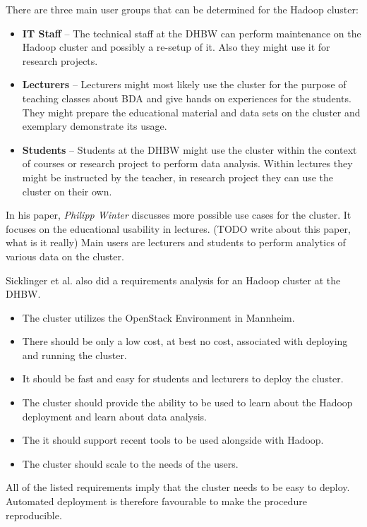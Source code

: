 There are three main user groups that can be determined for the Hadoop cluster:

\begin{itemize}
    \item \textbf{IT Staff} -- The technical staff at the \ac{DHBW} can perform maintenance on the Hadoop cluster and possibly a re-setup of it.
    Also they might use it for research projects.
    \item \textbf{Lecturers} -- Lecturers might most likely use the cluster for the purpose of teaching classes about \ac{BDA} and give hands on experiences for the students. They might prepare the educational material and data sets on the cluster and exemplary demonstrate its usage.
    \item \textbf{Students} -- Students at the \ac{DHBW} might use the cluster within the context of courses or research project to perform data analysis. Within lectures they might be instructed by the teacher, in research project they can use the cluster on their own.
\end{itemize}

In his paper, \emph{Philipp Winter} discusses more possible use cases for the cluster. It focuses on the educational usability in lectures.
(TODO write about this paper, what is it really)
Main users are lecturers and students to perform analytics of various data on the cluster.

Sicklinger et al. also did a requirements analysis for an Hadoop cluster at the \ac{DHBW}. 
\begin{itemize}
    \item The cluster utilizes the OpenStack Environment in Mannheim.
    \item There should be only a low cost, at best no cost, associated with deploying and running the cluster.
    \item It should be fast and easy for students and lecturers to deploy the cluster.
    \item The cluster should provide the ability to be used to learn about the Hadoop deployment and learn about data analysis.
    \item The it should support recent tools to be used alongside with Hadoop.
    \item The cluster should scale to the needs of the users.
\end{itemize}
\autocite[][p. 40ff]{wi2018managementsystems}


All of the listed requirements imply that the cluster needs to be easy to deploy. 
Automated deployment is therefore favourable to make the procedure reproducible. 


